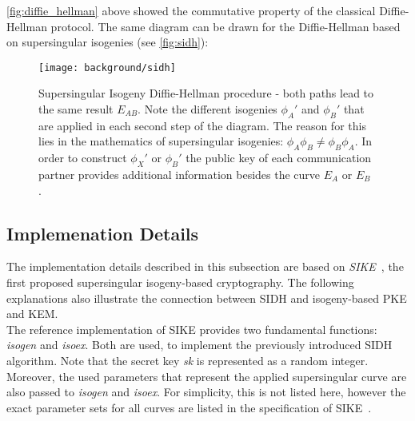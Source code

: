  \autoref{fig:diffie_hellman} above showed the commutative property of the classical Diffie-Hellman protocol. The same diagram can be drawn for the Diffie-Hellman based on supersingular isogenies (see \autoref{fig:sidh}):
\begin{figure}[H]
  \centering
  \texttt{[image: background/sidh]}
  \caption[Supersingular Isogeny Diffie-Hellman diagram]{Supersingular Isogeny Diffie-Hellman procedure - both paths lead to the same result $E_{AB}$. Note the different isogenies $\phi_{A}'$ and $\phi_{B}'$ that are applied in each second step of the diagram. The reason for this lies in the mathematics of supersingular isogenies: $\phi_{A} \phi_{B} \neq \phi_{B} \phi_{A}$. In order to construct $\phi_{X}'$ or $\phi_{B}'$ the public key of each communication partner provides additional information besides the curve $E_A$ or $E_B$.~\parencite{costello2016gentle}}
  \label{fig:sidh}
\end{figure}

\subsection{Implemenation Details}

The implementation details described in this subsection are based on \textit{\gls{SIKE}}~\parencite{sike2020spec}, the first proposed supersingular isogeny-based cryptography. The following explanations also illustrate the connection between SIDH and isogeny-based \gls{PKE} and \gls{KEM}.\\
The reference implementation of \gls{SIKE} provides two fundamental functions: \textit{isogen} and \textit{isoex}. Both are used, to implement the previously introduced \gls{SIDH} algorithm. Note that the secret key \textit{sk} is represented as a random integer. Moreover, the used parameters that represent the applied supersingular curve are also passed to \textit{isogen} and \textit{isoex}. For simplicity, this is not listed here, however the exact parameter sets for all curves are listed in the specification of \gls{SIKE}~\parencite{sike2020spec}.

